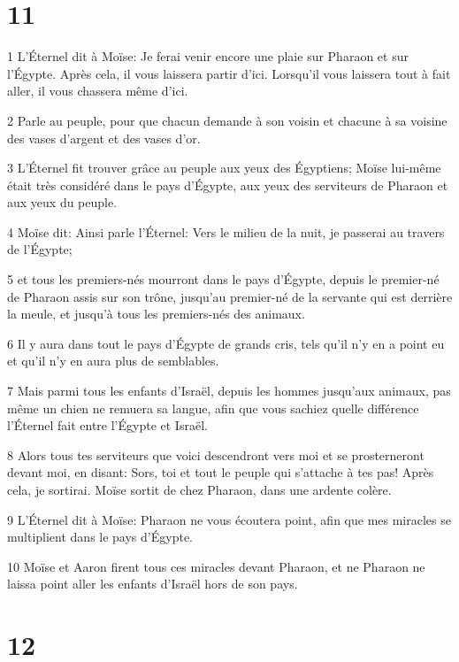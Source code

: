 \chapter{11}

\par 1 L'Éternel dit à Moïse: Je ferai venir encore une plaie sur Pharaon et sur l'Égypte. Après cela, il vous laissera partir d'ici. Lorsqu'il vous laissera tout à fait aller, il vous chassera même d'ici.
\par 2 Parle au peuple, pour que chacun demande à son voisin et chacune à sa voisine des vases d'argent et des vases d'or.
\par 3 L'Éternel fit trouver grâce au peuple aux yeux des Égyptiens; Moïse lui-même était très considéré dans le pays d'Égypte, aux yeux des serviteurs de Pharaon et aux yeux du peuple.
\par 4 Moïse dit: Ainsi parle l'Éternel: Vers le milieu de la nuit, je passerai au travers de l'Égypte;
\par 5 et tous les premiers-nés mourront dans le pays d'Égypte, depuis le premier-né de Pharaon assis sur son trône, jusqu'au premier-né de la servante qui est derrière la meule, et jusqu'à tous les premiers-nés des animaux.
\par 6 Il y aura dans tout le pays d'Égypte de grands cris, tels qu'il n'y en a point eu et qu'il n'y en aura plus de semblables.
\par 7 Mais parmi tous les enfants d'Israël, depuis les hommes jusqu'aux animaux, pas même un chien ne remuera sa langue, afin que vous sachiez quelle différence l'Éternel fait entre l'Égypte et Israël.
\par 8 Alors tous tes serviteurs que voici descendront vers moi et se prosterneront devant moi, en disant: Sors, toi et tout le peuple qui s'attache à tes pas! Après cela, je sortirai. Moïse sortit de chez Pharaon, dans une ardente colère.
\par 9 L'Éternel dit à Moïse: Pharaon ne vous écoutera point, afin que mes miracles se multiplient dans le pays d'Égypte.
\par 10 Moïse et Aaron firent tous ces miracles devant Pharaon, et ne Pharaon ne laissa point aller les enfants d'Israël hors de son pays.

\chapter{12}

